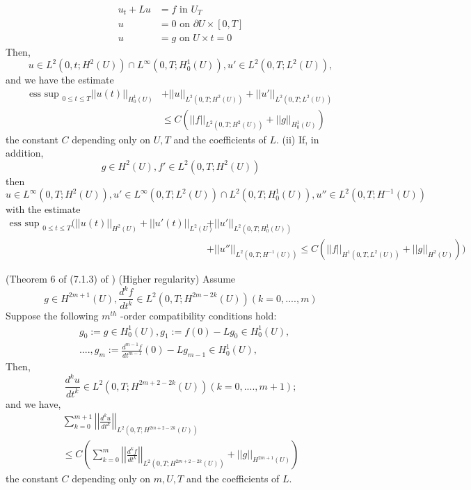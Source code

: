\begin{align*}
    u_t + Lu &= f \text{ in } U_T \\
    u &= 0 \text{ on } \partial U \times [0,T] \\
    u &= g \text{ on } U \times {t=0}
\end{align*}
Then,
\begin{equation*}
u \in L^2(0,t;H^2(U)) \cap L^\infty(0,T;H_0^1(U)), u' \in L^2(0,T;L^2(U)),
\end{equation*}
and we have the estimate
\begin{align*}
    \text{ess sup }_{0\leq t \leq T} ||u(t)||_{H_0^1(U)} & +  ||u||_{L^2(0,T;H^2(U))} + ||u'||_{L^2(0,T;L^2(U))} \\
    &\leq C\left( ||f||_{L^2(0,T;H^2(U))} + ||g||_{H_0^1(U)}   \right)
\end{align*}
the constant $C$ depending only on $U, T$ and the coefficients of $L$.
(ii) If, in addition,
\begin{equation*}
    g \in H^2(U), f' \in L^2(0,T;H^2(U))
\end{equation*}
then
\begin{equation*}
    u \in L^\infty(0,T;H^2(U)), u' \in L^\infty(0,T;L^2(U)) \cap L^2(0,T;H^1_0(U)), u'' \in L^2(0,T;H^{-1}(U))
\end{equation*}
with the estimate
\begin{align*}
 \text{ess sup }_{0\leq t \leq T}(
 ||u(t)||_{H^2(U)}+ ||u'(t)||_{L^2(U)} &+ ||u'||_{ L^2(0,T;H^1_0(U))} \\
 &+ ||u''||_{L^2(0,T;H^{-1}(U))} \leq C(||f||_{H^1(0,T, L^2(U))} +  ||g||_{H^2(U)})
 )  
\end{align*}

(Theorem 6 of (7.1.3) of \cite{evans}) (Higher regularity)
Assume
\begin{equation*}
    g \in H^{2m + 1 }(U), \frac{d^kf}{dt^k} \in L^2(0,T;H^{2m-2k}(U)) (k = 0,....,m)
\end{equation*}
Suppose the following $m^{th}$ -order compatibility conditions hold:
\begin{align*}
    &g_0 := g \in H_0^1(U), g_1 := f(0)- Lg_0 \in H_0^1(U), \\
    &...., g_m := \frac{d^{m-1}f}{dt^{m-1}}(0) - Lg_{m-1} \in H_0^1(U),
\end{align*}
Then,
\begin{equation*}
    \frac{d^k u}{dt^k} \in L^2(0,T;H^{2m + 2 -2k}(U)) (k = 0,....,m+1);
\end{equation*}
and we have,
\begin{align*}
    \sum_{k= 0}^{m+1}\left|\left| \frac{d^k u}{dt^k}  \right| \right|_{L^2(0,T;H^{2m + 2 -2k}(U))} \\
    \leq C\left( \sum_{k= 0}^{m}\left|\left| \frac{d^k f}{dt^k}  \right| \right|_{L^2(0,T;H^{2m + 2 -2k}(U))}   + ||g||_{H^{2m+1}(U)}\right)
\end{align*}
the constant $C$ depending only on $m, U, T$ and the coefficients of $L$.


